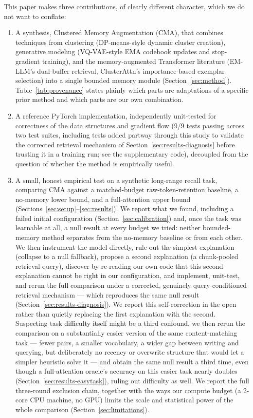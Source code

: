 \documentclass[11pt]{article}
\begin{document}
This paper makes three contributions, of clearly different character, which we do not want to
conflate:
\begin{enumerate}[leftmargin=1.4em,itemsep=1pt]
\item A synthesis, Clustered Memory Augmentation (CMA), that combines techniques from clustering
(DP-means-style dynamic cluster creation), generative modeling (VQ-VAE-style EMA codebook
updates and stop-gradient training), and the memory-augmented Transformer literature (EM-LLM's
dual-buffer retrieval, ClusterAttn's importance-based exemplar selection) into a single bounded
memory module (Section~\ref{sec:method}). Table~\ref{tab:provenance} states plainly which parts
are adaptations of a specific prior method and which parts are our own combination.
\item A reference PyTorch implementation, independently unit-tested for correctness of the
data structures and gradient flow (9/9 tests passing across two test suites, including tests added
partway through this study to validate the corrected retrieval mechanism of
Section~\ref{sec:results-diagnosis} before trusting it in a training run; see the supplementary
code), decoupled from the question of whether the method is empirically useful.
\item A small, honest empirical test on a synthetic long-range recall task, comparing CMA against
a matched-budget raw-token-retention baseline, a no-memory lower bound, and a full-attention
upper bound (Sections~\ref{sec:setup}--\ref{sec:results}). We report what we found, including a
failed initial configuration (Section~\ref{sec:calibration}) and, once the task was learnable at
all, a null result at every budget we tried: neither bounded-memory method separates from the
no-memory baseline or from each other. We then instrument the model directly, rule out the
simplest explanation (collapse to a null fallback), propose a second explanation (a chunk-pooled
retrieval query), discover by re-reading our own code that this second explanation cannot be right
in our configuration, and implement, unit-test, and rerun the full comparison under a corrected,
genuinely query-conditioned retrieval mechanism --- which reproduces the same null result
(Section~\ref{sec:results-diagnosis}). We report this self-correction in the open rather than
quietly replacing the first explanation with the second. Suspecting task difficulty itself might
be a third confound, we then rerun the comparison on a substantially easier version of the same
content-matching task --- fewer pairs, a smaller vocabulary, a wider gap between writing and
querying, but deliberately no recency or overwrite structure that would let a simpler heuristic
solve it --- and obtain the same null result a third time, even though a full-attention oracle's
accuracy on this easier task nearly doubles (Section~\ref{sec:results-easytask}), ruling out
difficulty as well. We report the full three-round exclusion chain, together with the ways our
compute budget (a 2-core CPU machine, no GPU) limits the scale and statistical power of the whole
comparison (Section~\ref{sec:limitations}).
\end{enumerate}
\end{document}
